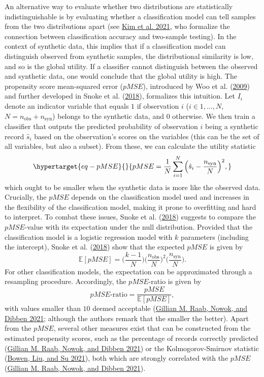 \documentclass[
]{article}
\newcommand{\nobs}{n_{\text{obs}}}
\newcommand{\nsyn}{n_{\text{syn}}}
\begin{document}
An alternative way to evaluate whether two distributions are
statistically indistinguishable is by evaluating whether a
classification model can tell samples from the two distributions apart
(see \protect\hyperlink{ref-kim_classification_2021}{Kim et al. 2021},
who formalize the connection between classification accuracy and
two-sample testing). In the context of synthetic data, this implies that
if a classification model can distinguish observed from synthetic
samples, the distributional similarity is low, and so is the global
utility. If a classifier cannot distinguish between the observed and
synthetic data, one would conclude that the global utility is high. The
propensity score mean-squared error (\(pMSE\)), introduced by Woo et al.
(\protect\hyperlink{ref-Woo_global_2009}{2009}) and further developed in
Snoke et al. (\protect\hyperlink{ref-snoke_utility_2018}{2018}),
formalizes this intuition. Let \(I_i\) denote an indicator variable that
equals \(1\) if observation \(i\) (\(i \in 1, \dots, N\),
\(N = \nobs + \nsyn\)) belongs to the synthetic data, and \(0\)
otherwise. We then train a classifier that outputs the predicted
probability of observation \(i\) being a synthetic record \(\hat{s}_i\)
based on the observation's scores on the variables (this can be the set
of all variables, but also a subset). From these, we can calculate the
utility statistic \begin{equation}\protect\hypertarget{eq-pMSE}{}{
pMSE = \frac{1}{N} \sum_{i=1}^N \Big(\hat{s}_i - \frac{\nsyn}{N}\Big)^2,
}\label{eq-pMSE}\end{equation} which ought to be smaller when the
synthetic data is more like the observed data. Crucially, the \(pMSE\)
depends on the classification model used and increases in the
flexibility of the classification model, making it prone to overfitting
and hard to interpret. To combat these issues, Snoke et al.
(\protect\hyperlink{ref-snoke_utility_2018}{2018}) suggests to compare
the \(pMSE\)-value with its expectation under the null distribution.
Provided that the classification model is a logistic regression model
with \(k\) parameters (including the intercept), Snoke et al.
(\protect\hyperlink{ref-snoke_utility_2018}{2018}) show that the
expected \(pMSE\) is given by \[
\mathbb{E}[pMSE] = \Big(\frac{k-1}{N}\Big) \Big(\frac{\nobs}{N}\Big)^2
\Big(\frac{\nsyn}{N}\Big).
\] For other classification models, the expectation can be approximated
through a resampling procedure. Accordingly, the \(pMSE\)-ratio is given
by \[
pMSE\text{-ratio} = \frac{pMSE}{\mathbb{E}[pMSE]},
\] with values smaller than \(10\) deemed acceptable
(\protect\hyperlink{ref-raab2021assessing}{Gillian M. Raab, Nowok, and
Dibben 2021}; although the authors remark that the smaller the better).
Apart from the \(pMSE\), several other measures exist that can be
constructed from the estimated propensity scores, such as the percentage
of records correctly predicted
(\protect\hyperlink{ref-raab2021assessing}{Gillian M. Raab, Nowok, and
Dibben 2021}) or the Kolmogorov-Smirnov statistic
(\protect\hyperlink{ref-Bowen_differentially_2021}{Bowen, Liu, and Su
2021}), both which are strongly correlated with the \(pMSE\)
(\protect\hyperlink{ref-raab2021assessing}{Gillian M. Raab, Nowok, and
Dibben 2021}).
\end{document}
